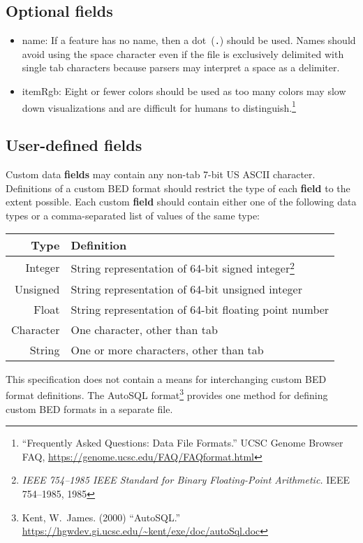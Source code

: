 \documentclass[11pt]{article}
\begin{document}
\subsection{Optional fields}\label{sec:optional}
\begin{itemize}
\item \textsf{name}: If a feature has no name, then a dot~(\texttt{.}) should be used.
  Names should avoid using the space character even if the file is exclusively delimited with single tab characters because parsers may interpret a space as a delimiter.

\item \textsf{itemRgb}: Eight or fewer colors should be used as too many colors may slow down visualizations and are difficult for humans to distinguish.\footnote{``Frequently
    Asked Questions: Data File Formats.'' \ac{UCSC} Genome Browser FAQ,
    \url{https://genome.ucsc.edu/FAQ/FAQformat.html}}

\end{itemize}

\subsection{User-defined fields}

Custom data \textbf{fields} may contain any non-tab 7-bit US \ac{ASCII} character.
Definitions of a custom \ac{BED} format should restrict the type of each \textbf{field} to the extent possible.
Each custom \textbf{field} should contain either one of the following data types or a comma-separated list of values of the same type:

\noindent
\begin{tabularx}{\textwidth}{r L}
  \toprule
  Type & Definition \\
  \midrule
  Integer & String representation of 64-bit signed integer\footnote{\emph{IEEE 754--1985 IEEE Standard for Binary Floating-Point Arithmetic.} IEEE 754--1985, 1985} \\
  Unsigned & String representation of 64-bit unsigned integer\footnotemark[10] \\
  Float & String representation of 64-bit floating point number\footnotemark[10] \\
  Character & One character, other than tab \\
  String & One or more characters, other than tab \\
  \bottomrule
\end{tabularx}

This specification does not contain a means for interchanging custom \ac{BED} format definitions.
The AutoSQL format\footnote{Kent, W.~James.
  (2000) ``AutoSQL.''
  \url{https://hgwdev.gi.ucsc.edu/~kent/exe/doc/autoSql.doc}} provides one method for defining custom \ac{BED} formats in a separate file.
\end{document}
